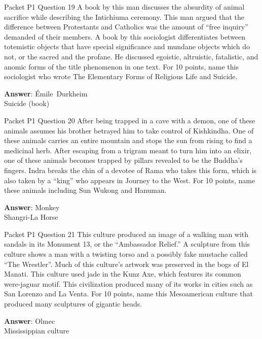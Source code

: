 \begin{frame}{Packet P1 Question 19}
A book by this man discusses the absurdity of animal sacrifice while describing the Intichiuma ceremony. This man argued that the difference between Protestants and Catholics was the amount of ``free inquiry'' demanded of their members. A book by this sociologist differentiates between totemistic objects   that have special significance and mundane objects which do not, or the sacred and the profane. He   discussed egoistic, altruistic, fatalistic,     and anomic forms   of the title phenomenon in one text. For 10 points, name this sociologist who wrote The Elementary Forms of Religious Life and Suicide.

\textbf{Answer}: Émile\ Durkheim\\
 Suicide (book)
\end{frame}

\begin{frame}{Packet P1 Question 20}
After being trapped in   a cave with a demon, one of these animals assumes his brother betrayed him to take   control of Kishkindha. One of these   animals carries an entire mountain and stops the sun from rising to find a medicinal herb. After escaping   from a trigram meant to turn him into an elixir, one of these animals becomes trapped by pillars revealed to be the Buddha's fingers. Indra breaks the chin of a devotee of Rama who takes this form, which is also taken by a ``king'' who appears in Journey to the West. For 10 points, name these animals including Sun Wukong and Hanuman.  

\textbf{Answer}: Monkey\\
 Shangri-La
 Horse
\end{frame}

\begin{frame}{Packet P1 Question 21}
This culture produced an image of a walking man with sandals in its Monument 13, or the ``Ambassador Relief.'' A sculpture from this culture shows a man with a twisting torso and a possibly fake mustache called “The Wrestler”. Much of this culture’s artwork was preserved in the bogs of El Manati. This culture used jade in the Kunz Axe, which   features its common   were-jaguar motif. This civilization produced many of its works in cities such as San Lorenzo and La Venta. For 10 points, name this Mesoamerican culture that produced   many sculptures of gigantic heads.  

\textbf{Answer}: Olmec\\
 Mississippian culture
\end{frame}

